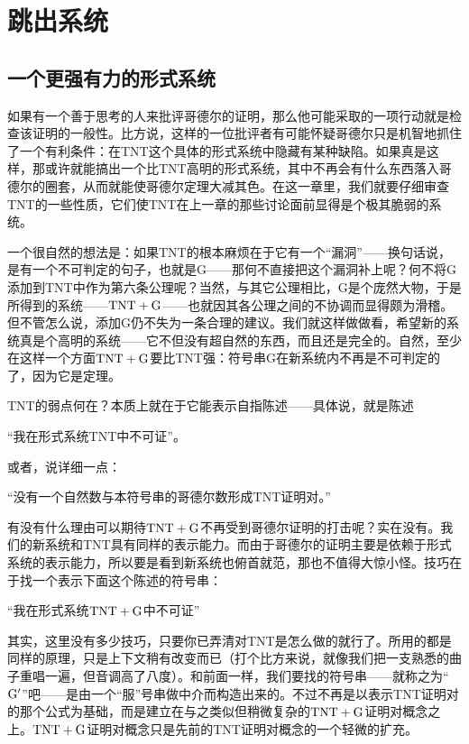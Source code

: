 
\chapter{跳出系统}

\section{一个更强有力的形式系统}

如果有一个善于思考的人来批评哥德尔的证明，那么他可能采取的一项行动就是检查该证明的一般性。比方说，这样的一位批评者有可能怀疑哥德尔只是机智地抓住了一个有利条件：在TNT这个具体的形式系统中隐藏有某种缺陷。如果真是这样，那或许就能搞出一个比TNT高明的形式系统，其中不再会有什么东西落入哥德尔的圈套，从而就能使哥德尔定理大减其色。在这一章里，我们就要仔细审查TNT的一些性质，它们使TNT在上一章的那些讨论面前显得是个极其脆弱的系统。

一个很自然的想法是：如果TNT的根本麻烦在于它有一个“漏洞”——换句话说，是有一个不可判定的句子，也就是G——那何不直接把这个漏洞补上呢？何不将G添加到TNT中作为第六条公理呢？当然，与其它公理相比，G是个庞然大物，于是所得到的系统——$\mathrm { TNT }+\mathrm { G }$——也就因其各公理之间的不协调而显得颇为滑稽。但不管怎么说，添加G仍不失为一条合理的建议。我们就这样做做看，希望新的系统真是个高明的系统——它不但没有超自然的东西，而且还是完全的。自然，至少在这样一个方面$\mathrm { TNT }+\mathrm { G }$要比TNT强：符号串G在新系统内不再是不可判定的了，因为它是定理。

TNT的弱点何在？本质上就在于它能表示自指陈述——具体说，就是陈述

\begin{block}
“我在形式系统TNT中不可证”。
\end{block}
或者，说详细一点：

\begin{block}
“没有一个自然数与本符号串的哥德尔数形成TNT证明对。”
\end{block}

有没有什么理由可以期待$\mathrm { TNT }+\mathrm { G }$不再受到哥德尔证明的打击呢？实在没有。我们的新系统和TNT具有同样的表示能力。而由于哥德尔的证明主要是依赖于形式系统的表示能力，所以要是看到新系统也俯首就范，那也不值得大惊小怪。技巧在于找一个表示下面这个陈述的符号串：

\begin{block}
“我在形式系统$\mathrm { TNT }+\mathrm { G }$中不可证”
\end{block}
其实，这里没有多少技巧，只要你已弄清对TNT是怎么做的就行了。所用的都是同样的原理，只是上下文稍有改变而已（打个比方来说，就像我们把一支熟悉的曲子重唱一遍，但音调高了八度）。和前面一样，我们要找的符号串——就称之为“$\mathrm { G }'$”吧——是由一个“服”号串做中介而构造出来的。不过不再是以表示TNT证明对的那个公式为基础，而是建立在与之类似但稍微复杂的$\mathrm { TNT }+\mathrm { G }$证明对概念之上。$\mathrm { TNT }+\mathrm { G }$证明对概念只是先前的TNT证明对概念的一个轻微的扩充。

